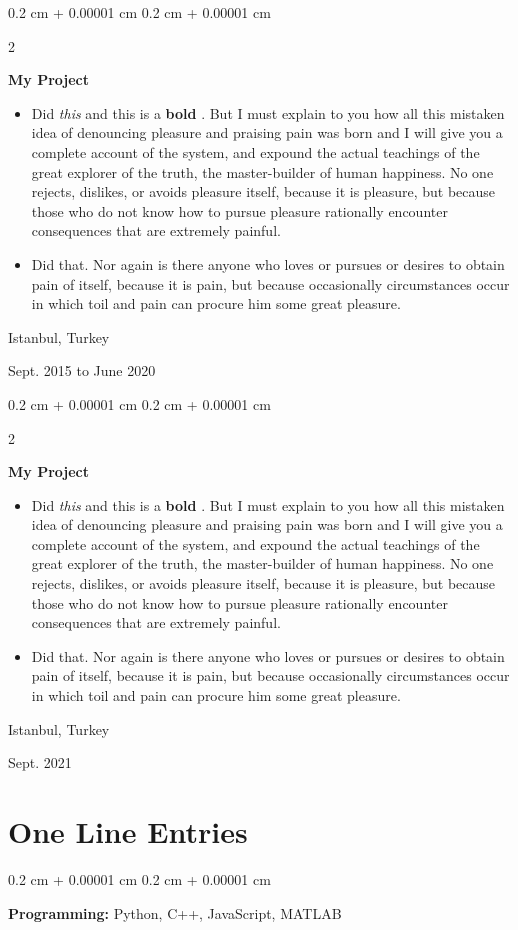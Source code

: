 \documentclass[10pt, letterpaper]{article}
\newenvironment{highlights}{
    \begin{itemize}[
        topsep=0.10 cm,
        parsep=0.10 cm,
        partopsep=0pt,
        itemsep=0pt,
        leftmargin=0.4 cm + 10pt
    ]
}{
    \end{itemize}
} %
\newenvironment{onecolentry}{
    \begin{adjustwidth}{
        0.2 cm + 0.00001 cm
    }{
        0.2 cm + 0.00001 cm
    }
}{
    \end{adjustwidth}
} %
\newenvironment{twocolentry}[2][]{
    \onecolentry
    \def\secondColumn{#2}
    \setcolumnwidth{\fill, 4.5 cm}
    \begin{paracol}{2}
}{
    \switchcolumn \raggedleft \secondColumn
    \end{paracol}
    \endonecolentry
} %
\let\hrefWithoutArrow\href
\renewcommand{\href}[2]{\hrefWithoutArrow{#1}{\mbox{\ifthenelse{\equal{#2}{}}{ }{#2 }\raisebox{.15ex}{\footnotesize \faExternalLink*}}}}
\begin{document}
        \vspace{0.2 cm}

        \begin{twocolentry}{
            Istanbul, Turkey

        Sept. 2015 to June 2020
        }
            \textbf{My Project}
            \begin{highlights}
                \item Did \textit{this} and this is a \textbf{bold} \href{https://example.com}{link}. But I must explain to you how all this mistaken idea of denouncing pleasure and praising pain was born and I will give you a complete account of the system, and expound the actual teachings of the great explorer of the truth, the master-builder of human happiness. No one rejects, dislikes, or avoids pleasure itself, because it is pleasure, but because those who do not know how to pursue pleasure rationally encounter consequences that are extremely painful.
                \item Did that. Nor again is there anyone who loves or pursues or desires to obtain pain of itself, because it is pain, but because occasionally circumstances occur in which toil and pain can procure him some great pleasure.
            \end{highlights}
        \end{twocolentry}


        \vspace{0.2 cm}

        \begin{twocolentry}{
            Istanbul, Turkey

        Sept. 2021
        }
            \textbf{My Project}
            \begin{highlights}
                \item Did \textit{this} and this is a \textbf{bold} \href{https://example.com}{link}. But I must explain to you how all this mistaken idea of denouncing pleasure and praising pain was born and I will give you a complete account of the system, and expound the actual teachings of the great explorer of the truth, the master-builder of human happiness. No one rejects, dislikes, or avoids pleasure itself, because it is pleasure, but because those who do not know how to pursue pleasure rationally encounter consequences that are extremely painful.
                \item Did that. Nor again is there anyone who loves or pursues or desires to obtain pain of itself, because it is pain, but because occasionally circumstances occur in which toil and pain can procure him some great pleasure.
            \end{highlights}
        \end{twocolentry}



    
    \section{One Line Entries}

        
        \begin{onecolentry}
            \textbf{Pro\textnormal{gram}ming:} Python, C++, JavaScript, MATLAB
        \end{onecolentry}


    
\end{document}
